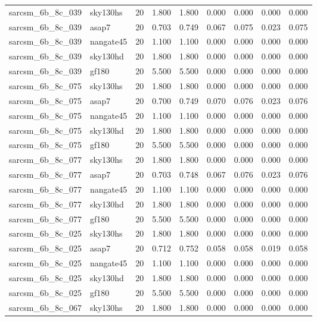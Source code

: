 \begin{tabular}{llrrrrrrr}
sarcsm\_6b\_8c\_039 & sky130hs & 20 & 1.800 & 1.800 & 0.000 & 0.000 & 0.000 & 0.000 \\
sarcsm\_6b\_8c\_039 & asap7 & 20 & 0.703 & 0.749 & 0.067 & 0.075 & 0.023 & 0.075 \\
sarcsm\_6b\_8c\_039 & nangate45 & 20 & 1.100 & 1.100 & 0.000 & 0.000 & 0.000 & 0.000 \\
sarcsm\_6b\_8c\_039 & sky130hd & 20 & 1.800 & 1.800 & 0.000 & 0.000 & 0.000 & 0.000 \\
sarcsm\_6b\_8c\_039 & gf180 & 20 & 5.500 & 5.500 & 0.000 & 0.000 & 0.000 & 0.000 \\
sarcsm\_6b\_8c\_075 & sky130hs & 20 & 1.800 & 1.800 & 0.000 & 0.000 & 0.000 & 0.000 \\
sarcsm\_6b\_8c\_075 & asap7 & 20 & 0.700 & 0.749 & 0.070 & 0.076 & 0.023 & 0.076 \\
sarcsm\_6b\_8c\_075 & nangate45 & 20 & 1.100 & 1.100 & 0.000 & 0.000 & 0.000 & 0.000 \\
sarcsm\_6b\_8c\_075 & sky130hd & 20 & 1.800 & 1.800 & 0.000 & 0.000 & 0.000 & 0.000 \\
sarcsm\_6b\_8c\_075 & gf180 & 20 & 5.500 & 5.500 & 0.000 & 0.000 & 0.000 & 0.000 \\
sarcsm\_6b\_8c\_077 & sky130hs & 20 & 1.800 & 1.800 & 0.000 & 0.000 & 0.000 & 0.000 \\
sarcsm\_6b\_8c\_077 & asap7 & 20 & 0.703 & 0.748 & 0.067 & 0.076 & 0.023 & 0.076 \\
sarcsm\_6b\_8c\_077 & nangate45 & 20 & 1.100 & 1.100 & 0.000 & 0.000 & 0.000 & 0.000 \\
sarcsm\_6b\_8c\_077 & sky130hd & 20 & 1.800 & 1.800 & 0.000 & 0.000 & 0.000 & 0.000 \\
sarcsm\_6b\_8c\_077 & gf180 & 20 & 5.500 & 5.500 & 0.000 & 0.000 & 0.000 & 0.000 \\
sarcsm\_6b\_8c\_025 & sky130hs & 20 & 1.800 & 1.800 & 0.000 & 0.000 & 0.000 & 0.000 \\
sarcsm\_6b\_8c\_025 & asap7 & 20 & 0.712 & 0.752 & 0.058 & 0.058 & 0.019 & 0.058 \\
sarcsm\_6b\_8c\_025 & nangate45 & 20 & 1.100 & 1.100 & 0.000 & 0.000 & 0.000 & 0.000 \\
sarcsm\_6b\_8c\_025 & sky130hd & 20 & 1.800 & 1.800 & 0.000 & 0.000 & 0.000 & 0.000 \\
sarcsm\_6b\_8c\_025 & gf180 & 20 & 5.500 & 5.500 & 0.000 & 0.000 & 0.000 & 0.000 \\
sarcsm\_6b\_8c\_067 & sky130hs & 20 & 1.800 & 1.800 & 0.000 & 0.000 & 0.000 & 0.000 \\

\end{tabular}
